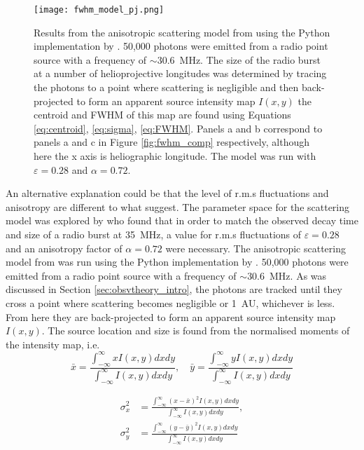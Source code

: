 \begin{figure}
\centering
\texttt{[image: fwhm\_model\_pj.png]}
\caption[The modelled size and aspect ratio of a radio burst at 30.6~MHz.]{Results from the anisotropic scattering model from \cite{Kontar2019} using the Python implementation by \cite{Zhang2021}. 50,000 photons were emitted from a radio point source with a frequency of $\sim 30.6$~MHz. The size of the radio burst at a number of helioprojective longitudes was determined by tracing the photons to a point where scattering is negligible and then back-projected to form an apparent source intensity map $I(x,y)$ the centroid and FWHM of this map are found using Equations \ref{eq:centroid}, \ref{eq:sigma}, \ref{eq:FWHM}. Panels a and b correspond to panels a and c in Figure \ref{fig:fwhm_comp} respectively, although here the x axis is heliographic longitude. The model was run with $\varepsilon = 0.28$ and $\alpha = 0.72$.}
\label{fig:model_comp}
\end{figure}


An alternative explanation could be that the level of r.m.s fluctuations and anisotropy are different to what \cite{Kontar2019} suggest. The parameter space for the scattering model was explored by \cite{Zhang2021} who found that in order to match the observed decay time and size of a radio burst at 35~MHz, a value for r.m.s fluctuations of $\varepsilon = 0.28$ and an anisotropy factor of $\alpha = 0.72$ were necessary. 
The anisotropic scattering model from \cite{Kontar2019} was run using the Python implementation by \cite{Zhang2021}. 50,000 photons were emitted from a radio point source with a frequency of $\sim 30.6$~MHz. As was discussed in Section \ref{sec:obsvtheory_intro}, the photons are tracked until they cross a point where scattering becomes negligible or 1~AU, whichever is less. From here they are back-projected to form an apparent source intensity map $I(x,y)$. The source location and size is found from the normalised moments of the intensity map, i.e.
\begin{equation}
\label{eq:centroid}
\bar{x} = \frac{\int_{-\infty}^{\infty} xI(x,y)dxdy}{\int_{-\infty}^{\infty} I(x,y) dxdy}, \quad \bar{y} = \frac{\int_{-\infty}^{\infty} yI(x,y)dxdy}{\int_{-\infty}^{\infty} I(x,y) dxdy} 
\end{equation}

\begin{equation}
\label{eq:sigma}
\begin{aligned}
\sigma_x^2 &= \frac{\int_{-\infty}^{\infty} (x-\bar{x})^2I(x,y)dxdy}{\int_{-\infty}^{\infty} I(x,y) dxdy}, \\
\sigma_y^2 &= \frac{\int_{-\infty}^{\infty} (y-\bar{y})^2I(x,y)dxdy}{\int_{-\infty}^{\infty} I(x,y) dxdy}  
\end{aligned}
\end{equation}

